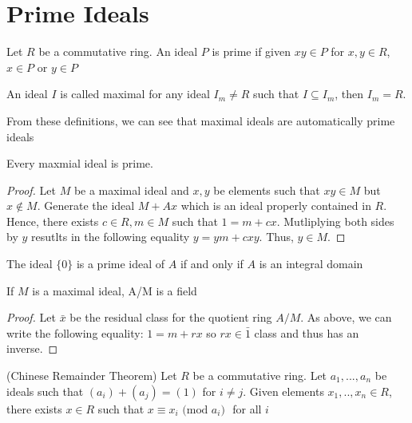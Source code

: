 \documentclass[main.tex]{subfiles}
\begin{document}
 
\section{Prime Ideals}

\begin{definition}
 Let $R$ be a commutative ring. An ideal $P$ is prime if given $xy \in P$ for $x,y \in R$, $x \in P$ or $y \in P$
\end{definition}

\begin{definition}
 An ideal $I$ is called maximal for any ideal $I_m \neq R$ such that $I \subseteq I_m$, then $I_m = R$.
\end{definition}

From these definitions, we can see that maximal ideals are automatically prime ideals

\begin{theorem}
 Every maxmial ideal is prime.
\end{theorem}

\begin{proof}
Let $M$ be a maximal ideal and $x,y$ be elements such that $xy \in M $ but $x \not\in M$. Generate the ideal $M + Ax$ which is an ideal properly contained in $R$. Hence, there exists $c \in R, m \in M$ such that $1 = m + cx$. Mutliplying both sides by $y$ resutlts in the following equality $y = ym + cxy$. Thus, $y \in M$.
\end{proof}

\begin{remark}
 The ideal $\{0\}$ is a prime ideal of $A$ if and only if $A$ is an integral domain
\end{remark}

\begin{theorem}
 If $M$ is a maximal ideal, A/M is a field
\end{theorem}

\begin{proof}
 Let $\bar{x}$ be the residual class for the quotient ring $A/M$. As above, we can write the following equality: $1 = m + rx$ so $rx \in \bar{1}$ class and thus has an inverse. 
\end{proof}

\begin{theorem} (Chinese Remainder Theorem)
Let $R$ be a commutative ring. Let  $a_1,...,a_n$ be ideals such that $(a_i) + (a_j) = (1)$ for $i \neq j$. Given elements $x_1,..,x_n \in R$, there exists $x \in R$ such that $x \equiv x_i \text{ (mod $a_i$) }$ for all $i$
\end{theorem}
\end{document}
